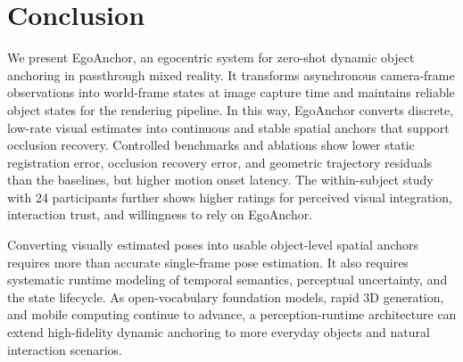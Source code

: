 \documentclass[review]{vgtc}
\begin{document}
\section{Conclusion}\label{sec:conclusion}

We present EgoAnchor, an egocentric system for zero-shot dynamic object anchoring in passthrough mixed reality. It transforms asynchronous camera-frame observations into world-frame states at image capture time and maintains reliable object states for the rendering pipeline. In this way, EgoAnchor converts discrete, low-rate visual estimates into continuous and stable spatial anchors that support occlusion recovery. Controlled benchmarks and ablations show lower static registration error, occlusion recovery error, and geometric trajectory residuals than the baselines, but higher motion onset latency. The within-subject study with 24 participants further shows higher ratings for perceived visual integration, interaction trust, and willingness to rely on EgoAnchor.

Converting visually estimated poses into usable object-level spatial anchors requires more than accurate single-frame pose estimation. It also requires systematic runtime modeling of temporal semantics, perceptual uncertainty, and the state lifecycle. As open-vocabulary foundation models, rapid 3D generation, and mobile computing continue to advance, a perception-runtime architecture can extend high-fidelity dynamic anchoring to more everyday objects and natural interaction scenarios.




\end{document}
